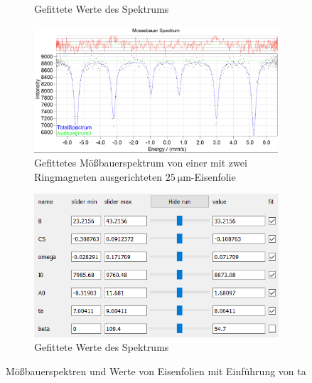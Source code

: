 \documentclass[german, %
parskip=full, %
bibliography=totoc, %
]{scrartcl}
\begin{document}
\begin{figure}[ht]
\begin{subfigure}[b]{0.4\textwidth}
	  \caption{Gefittete Werte des Spektrums}
	  \label{fig:werte25geradeta}
  \end{subfigure}
	\begin{subfigure}[b]{0.5\textwidth}
		\includegraphics[width=\textwidth]{MoessbauerEisen25MagnetRingmitTA}
	  \caption{Gefittetes Mößbauerspektrum von einer mit zwei Ringmagneten ausgerichteten \(\SI{25}{\micro\meter}\)-Eisenfolie}
	  \label{fig:moess25ringta}
  \end{subfigure}
  \begin{subfigure}[b]{0.4\textwidth}
	  \includegraphics[width=\textwidth]{WerteEisen25MagnetRingmitTA}
	  \caption{Gefittete Werte des Spektrums}
	  \label{fig:werte25ringta}
  \end{subfigure}
	\caption{Mößbauerspektren und Werte von Eisenfolien mit Einführung von ta}
	\label{fig:eisenta}
\end{figure}
\end{document}
